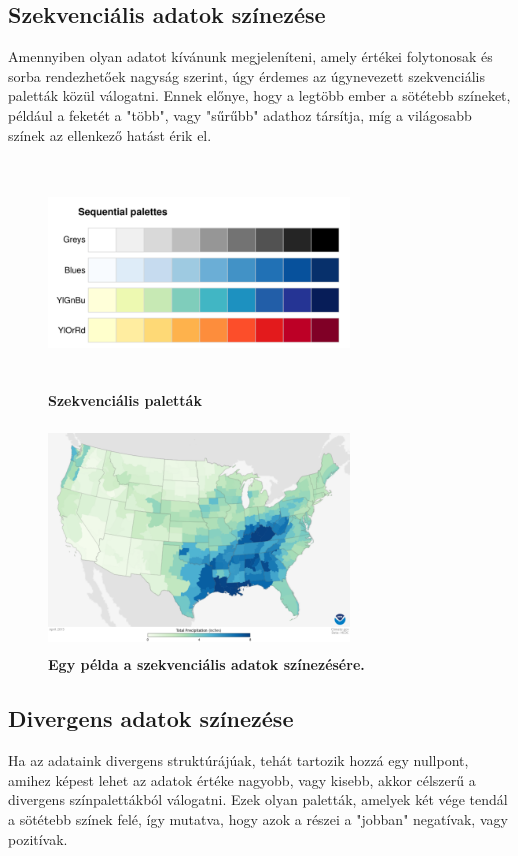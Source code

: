 \documentclass[12pt]{article}
\theoremstyle{plain}
\begin{document}
 \subsection{Szekvenciális adatok színezése}
 
 Amennyiben olyan adatot kívánunk megjeleníteni, amely értékei folytonosak és sorba rendezhetőek nagyság szerint, úgy érdemes az úgynevezett szekvenciális paletták közül válogatni. Ennek előnye, hogy a legtöbb ember a sötétebb színeket, például a feketét a "több", vagy "sűrűbb" adathoz társítja, míg a világosabb színek az ellenkező hatást érik el. 
 
 \begin{figure}[H]
    \centering
    \includegraphics[width=8cm, height=6cm]{media/sequential.png}
    \caption{\textbf{Szekvenciális paletták}}
    \label{fig:GeneralDiagram}
 \end{figure}
 
  \begin{figure}[H]
    \centering
    \includegraphics[width=8cm, height=6cm]{media/map.png}
    \caption{\textbf{Egy példa a szekvenciális adatok színezésére.}}
    \label{fig:GeneralDiagram}
 \end{figure}
 \subsection{Divergens adatok színezése}
 Ha az adataink divergens struktúrájúak, tehát tartozik hozzá egy nullpont, amihez képest lehet az adatok értéke nagyobb, vagy kisebb, akkor célszerű a divergens színpalettákból válogatni. Ezek olyan paletták, amelyek két vége tendál a sötétebb színek felé, így mutatva, hogy azok a részei a "jobban" negatívak, vagy pozitívak.
 
\end{document}
